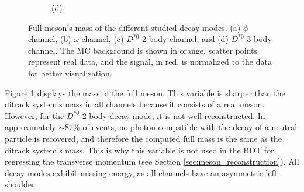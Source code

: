\begin{figure}[!ht]
\begin{subfigure}[t]{0.50\mylength}
        \caption{\footnotesize (d)}
    \end{subfigure}%
\caption{Full meson's mass of the different studied decay modes. (a) $\phi$ channel, (b) $\omega$ channel, (c) $D^{*0}$ 2-body channel, and (d) $D^{*0}$ 3-body channel. The MC background is shown in orange, scatter points represent real data, and the signal, in red, is normalized to the data for better visualization.}
\label{fig:full_mass_data}
    \vspace*{-0.0cm}
\end{figure}

Figure \ref{fig:full_mass_data} displays the mass of the full meson. This variable is sharper than the ditrack system's mass in all channels because it consists of a real meson. However, for the $D^{*0}$ 2-body decay mode, it is not well reconstructed. In approximately $\sim 87\%$ of events, no photon compatible with the decay of a neutral particle is recovered, and therefore the computed full mass is the same as the ditrack system's mass. This is why this variable is not used in the BDT for regressing the transverse momentum (see Section \ref{sec:meson_reconstruction}). All decay modes exhibit missing energy, as all channels have an asymmetric left shoulder.

